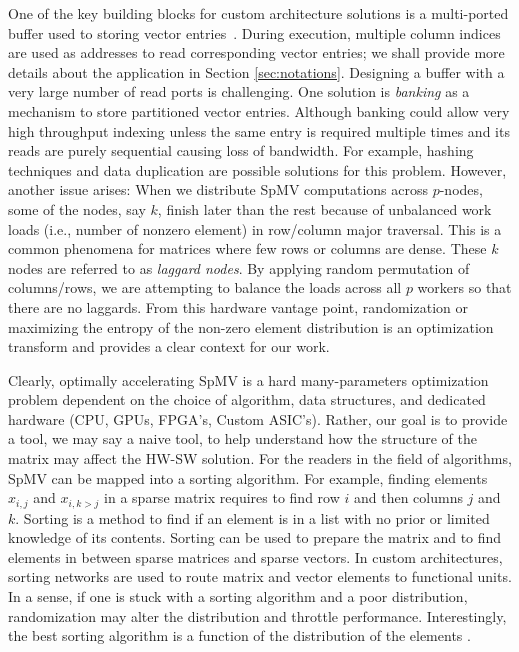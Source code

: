 \documentclass[acmsmall]{acmart}
\begin{document}
One of the key building blocks for custom architecture solutions is a
multi-ported buffer used to storing vector
entries~\cite{fowers2014high}.  During execution, multiple column
indices are used as addresses to read corresponding vector entries; we
shall provide more details about the application in Section
\ref{sec:notations}.  Designing a buffer with a very large number of
read ports is challenging.  One solution is {\em banking} as a
mechanism to store partitioned vector entries.  Although banking could
allow very high throughput indexing unless the same entry is required
multiple times and its reads are purely sequential causing loss of
bandwidth.  For example, hashing techniques and data duplication are
possible solutions for this problem. However, another issue arises:
When we distribute SpMV computations across $p$-nodes, some of the
nodes, say $k$, finish later than the rest because of unbalanced work
loads (i.e., number of nonzero element) in row/column major
traversal. This is a common phenomena for matrices where few rows or
columns are dense. These $k$ nodes are referred to as {\em laggard
  nodes}.  By applying random permutation of columns/rows, we are
attempting to balance the loads across all $p$ workers so that there
are no laggards. From this hardware vantage point, randomization or
maximizing the entropy of the non-zero element distribution is an
optimization transform and provides a clear context for our work.

Clearly, optimally accelerating SpMV is a hard many-parameters
optimization problem dependent on the choice of algorithm, data
structures, and dedicated hardware (CPU, GPUs, FPGA's, Custom ASIC's).
Rather, our goal is to provide a tool, we may say a naive tool, to
help understand how the structure of the matrix may affect the HW-SW
solution.  For the readers in the field of algorithms, SpMV can be
mapped into a sorting algorithm. For example, finding elements
$x_{i,j}$ and $x_{i,k>j}$ in a sparse matrix requires to find row $i$
and then columns $j$ and $k$.  Sorting is a method to find if an
element is in a list with no prior or limited knowledge of its
contents.  Sorting can be used to prepare the matrix and to find
elements in between sparse matrices and sparse vectors. In custom
architectures, sorting networks are used to route matrix and vector
elements to functional units. In a sense, if one is stuck with a
sorting algorithm and a poor distribution, randomization may alter the
distribution and throttle performance. Interestingly, the best sorting
algorithm is a function of the distribution of the elements
\cite{LiGP2004,HuangGl2009}.
\end{document}
